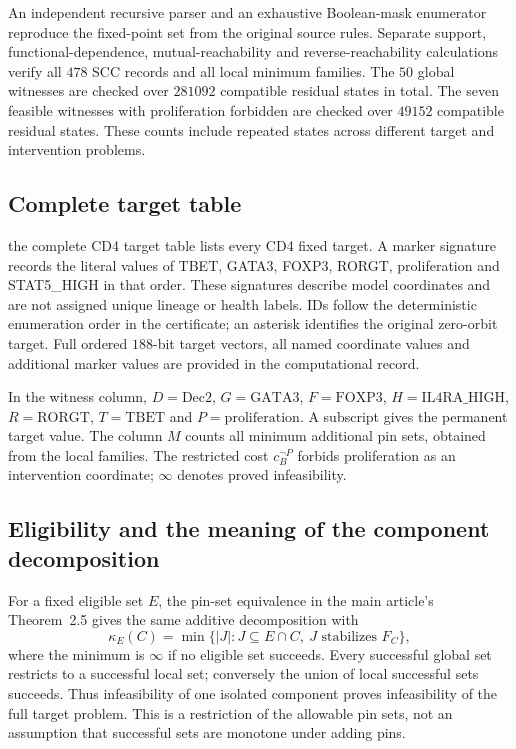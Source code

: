 An independent recursive parser and an exhaustive Boolean-mask enumerator
reproduce the fixed-point set from the original source rules. Separate
support, functional-dependence, mutual-reachability and reverse-reachability
calculations verify all $478$ SCC records and all local minimum families.
The $50$ global witnesses are checked over $281092$ compatible residual
states in total. The seven feasible witnesses with proliferation forbidden
are checked over $49152$ compatible residual states. These counts include
repeated states across different target and intervention problems.

\subsection{Complete target table}
the complete CD4 target table lists every CD4 fixed target. A marker
signature records the literal values of TBET, GATA3, FOXP3, RORGT,
proliferation and STAT5\_HIGH in that order. These signatures describe
model coordinates and are not assigned unique lineage or health labels.
IDs follow the deterministic enumeration order in the certificate;
an asterisk identifies the original zero-orbit target. Full ordered
$188$-bit target vectors, all named coordinate values and additional
marker values are provided in the computational record.

In the witness column, $D=\mathrm{Dec2}$, $G=\mathrm{GATA3}$,
$F=\mathrm{FOXP3}$, $H=\mathrm{IL4RA\_HIGH}$, $R=\mathrm{RORGT}$,
$T=\mathrm{TBET}$ and $P=\mathrm{proliferation}$.
A subscript gives the permanent target value. The column $M$ counts
all minimum additional pin sets, obtained from the local families.
The restricted cost $c_B^{\neg P}$ forbids proliferation as an intervention
coordinate; $\infty$ denotes proved infeasibility.


\subsection{Eligibility and the meaning of the component decomposition}
For a fixed eligible set $E$, the pin-set equivalence in the main article's
Theorem~2.5 gives the same additive decomposition with
\[
 \kappa_E(C)=\min\{|J|:J\subseteq E\cap C,\ J\text{ stabilizes }F_C\},
\]
where the minimum is $\infty$ if no eligible set succeeds. Every successful
global set restricts to a successful local set; conversely the union of
local successful sets succeeds. Thus infeasibility of one isolated
component proves infeasibility of the full target problem. This is a
restriction of the allowable pin sets, not an assumption that successful
sets are monotone under adding pins.

